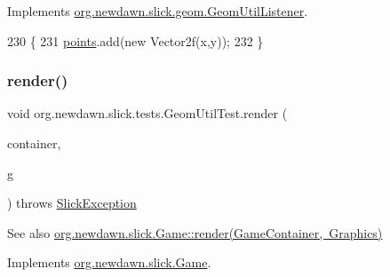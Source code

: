 Implements \mbox{\hyperlink{interfaceorg_1_1newdawn_1_1slick_1_1geom_1_1_geom_util_listener_a73777bd9904d9472db523c10d644db0a}{org.\+newdawn.\+slick.\+geom.\+Geom\+Util\+Listener}}.


\begin{DoxyCode}
230                                             \{
231         \mbox{\hyperlink{classorg_1_1newdawn_1_1slick_1_1tests_1_1_geom_util_test_ac17af1067ad6fc4f5e0d55ba2e6435d5}{points}}.add(\textcolor{keyword}{new} Vector2f(x,y));
232     \}
\end{DoxyCode}
\mbox{\label{classorg_1_1newdawn_1_1slick_1_1tests_1_1_geom_util_test_af020b3b88d7813defdc6cf0b32ede645}} 
\subsubsection{\texorpdfstring{render()}{render()}}
{\footnotesize\ttfamily void org.\+newdawn.\+slick.\+tests.\+Geom\+Util\+Test.\+render (\begin{DoxyParamCaption}\item[{\mbox{\hyperlink{classorg_1_1newdawn_1_1slick_1_1_game_container}{Game\+Container}}}]{container,  }\item[{\mbox{\hyperlink{classorg_1_1newdawn_1_1slick_1_1_graphics}{Graphics}}}]{g }\end{DoxyParamCaption}) throws \mbox{\hyperlink{classorg_1_1newdawn_1_1slick_1_1_slick_exception}{Slick\+Exception}}\hspace{0.3cm}{\ttfamily [inline]}}

\begin{DoxySeeAlso}{See also}
\mbox{\hyperlink{interfaceorg_1_1newdawn_1_1slick_1_1_game_af1a4670d43eb3ba04dfcf55ab1975b64}{org.\+newdawn.\+slick.\+Game\+::render(\+Game\+Container, Graphics)}} 
\end{DoxySeeAlso}


Implements \mbox{\hyperlink{interfaceorg_1_1newdawn_1_1slick_1_1_game_af1a4670d43eb3ba04dfcf55ab1975b64}{org.\+newdawn.\+slick.\+Game}}.



